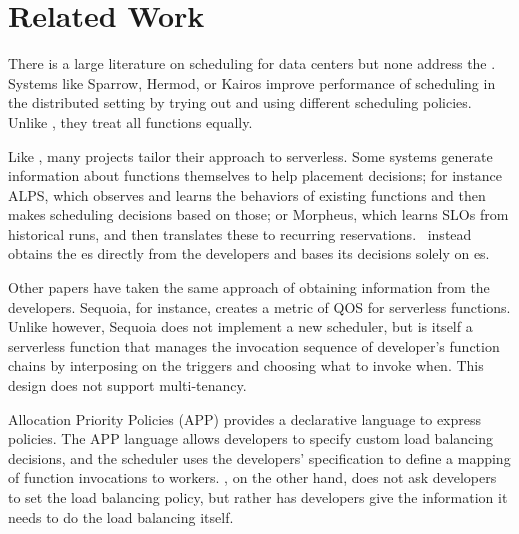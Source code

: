 \section{Related Work}

There is a large literature on scheduling for data centers but none
address the \problem.  Systems like Sparrow\cite{sparrow},
Hermod\cite{hermod}, or Kairos\cite{kairos} improve performance of
scheduling in the distributed setting by trying out and using
different scheduling policies. Unlike \sys{}, they treat all functions
equally.

Like \sys{}, many projects tailor their approach to serverless. Some systems
generate information about functions themselves to help placement decisions; for
instance ALPS\cite{alps}, which observes and learns the behaviors of existing
functions and then makes scheduling decisions based on those; or
Morpheus\cite{morpheus}, which learns SLOs from historical runs, and then
translates these to recurring reservations.~\Sys{} instead obtains the \class{}es
directly from the developers and bases its decisions solely on \class{}es.

Other papers have taken the same approach of obtaining information
from the developers. Sequoia\cite{sequoia}, for instance, creates a
metric of QOS for serverless functions. Unlike \sys{} however, Sequoia
does not implement a new scheduler, but is itself a serverless
function that manages the invocation sequence of developer's function
chains by interposing on the triggers and choosing what to invoke
when. This design does not support multi-tenancy.

Allocation Priority Policies (APP)\cite{app-paper} provides a declarative
language to express policies. The APP
language allows developers to specify custom load balancing
decisions, and the scheduler uses the developers' specification to define a
mapping of function invocations to workers. \Sys{}, on the other hand, does not
ask developers to set the load balancing policy, but rather has developers give
\sys{} the information it needs to do the load balancing itself.


